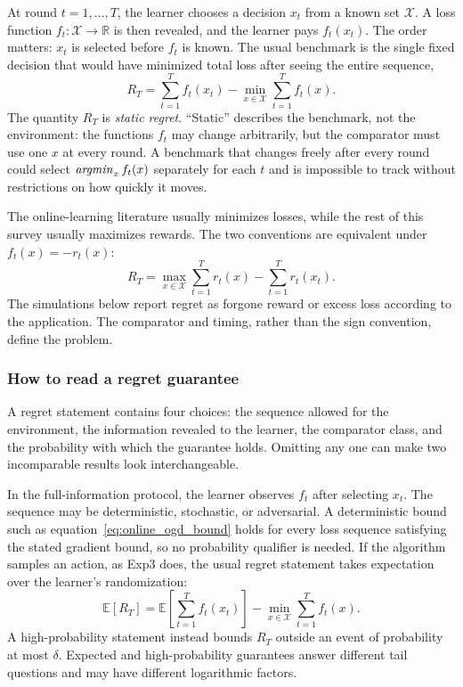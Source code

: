 At round $t=1,\ldots,T$, the learner chooses a decision $x_t$ from a known set $\mathcal X$. A loss function $f_t:\mathcal X\to\mathbb R$ is then revealed, and the learner pays $f_t(x_t)$. The order matters: $x_t$ is selected before $f_t$ is known. The usual benchmark is the single fixed decision that would have minimized total loss after seeing the entire sequence,
\begin{equation}
R_T
=
\sum_{t=1}^T f_t(x_t)
-
\min_{x\in\mathcal X}\sum_{t=1}^T f_t(x).
\label{eq:online_static_regret}
\end{equation}
The quantity $R_T$ is \emph{static regret}. ``Static'' describes the benchmark, not the environment: the functions $f_t$ may change arbitrarily, but the comparator must use one $x$ at every round. A benchmark that changes freely after every round could select $\mathop{\it argmin}_x f_t(x)$ separately for each $t$ and is impossible to track without restrictions on how quickly it moves.

The online-learning literature usually minimizes losses, while the rest of this survey usually maximizes rewards. The two conventions are equivalent under $f_t(x)=-r_t(x)$:
\begin{equation}
R_T
=
\max_{x\in\mathcal X}\sum_{t=1}^T r_t(x)
-
\sum_{t=1}^T r_t(x_t).
\label{eq:online_reward_regret}
\end{equation}
The simulations below report regret as forgone reward or excess loss according to the application. The comparator and timing, rather than the sign convention, define the problem.

\subsubsection{How to read a regret guarantee}

A regret statement contains four choices: the sequence allowed for the environment, the information revealed to the learner, the comparator class, and the probability with which the guarantee holds. Omitting any one can make two incomparable results look interchangeable.

In the full-information protocol, the learner observes $f_t$ after selecting $x_t$. The sequence may be deterministic, stochastic, or adversarial. A deterministic bound such as equation~\eqref{eq:online_ogd_bound} holds for every loss sequence satisfying the stated gradient bound, so no probability qualifier is needed. If the algorithm samples an action, as Exp3 does, the usual regret statement takes expectation over the learner's randomization:
\begin{equation}
\mathbb E[R_T]
=
\mathbb E\!\left[\sum_{t=1}^Tf_t(x_t)\right]
-
\min_{x\in\mathcal X}\sum_{t=1}^Tf_t(x).
\label{eq:online_expected_regret}
\end{equation}
A high-probability statement instead bounds $R_T$ outside an event of probability at most $\delta$. Expected and high-probability guarantees answer different tail questions and may have different logarithmic factors.

